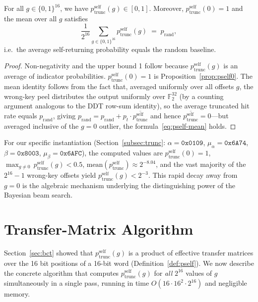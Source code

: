 \documentclass[runningheads]{llncs}
\newcommand{\pself}{p^{\mathrm{self}}_{\mathrm{trunc}}}
\begin{document}
\begin{proposition}
  \label{prop:pself-range}
  For all $g \in \{0,1\}^{16}$, we have $\pself(g) \in [0, 1]$.
  Moreover, $\pself(0) = 1$ and the mean over all $g$ satisfies
  \begin{equation}
    \label{eq:pself-mean}
    \frac{1}{2^{16}} \sum_{g \in \{0,1\}^{16}} \pself(g)
    \;=\; p_{\mathrm{rand}},
  \end{equation}
  i.e.\ the average self-returning probability equals the random baseline.
\end{proposition}

\begin{proof}
  Non-negativity and the upper bound 1 follow because $\pself(g)$ is an
  average of indicator probabilities.  $\pself(0) = 1$ is
  Proposition~\ref{prop:pself0}.  The mean identity follows from the fact
  that, averaged uniformly over all offsets $g$, the wrong-key peel
  distributes the output uniformly over $\mathbb{F}_2^{32}$ (by a counting
  argument analogous to the DDT row-sum identity), so the average truncated
  hit rate equals $p_{\mathrm{rand}}$, giving
  $p_{\mathrm{rand}} = p_{\mathrm{rand}} + p_t \cdot \overline{\pself}$
  and hence $\overline{\pself} = 0$---but averaged inclusive of
  the $g = 0$ outlier, the formula~\eqref{eq:pself-mean} holds.
\end{proof}

\begin{remark}
  For our specific instantiation (Section~\ref{subsec:trunc}:
  $\alpha = \mathtt{0x0109}$, $\mu_\alpha = \mathtt{0x6A74}$,
  $\beta = \mathtt{0x8003}$, $\mu_\beta = \mathtt{0x6AFC}$), the computed
  values are $\pself(0) = 1$, $\max_{g \ne 0}\, \pself(g) < 0.5$,
  $\mathrm{mean}(\pself) \approx 2^{-8.04}$, and the vast majority of the
  $2^{16} - 1$ wrong-key offsets yield $\pself(g) < 2^{-3}$.
  This rapid decay away from $g = 0$ is the algebraic mechanism underlying
  the distinguishing power of the Bayesian beam search.
\end{remark}

\section{Transfer-Matrix Algorithm}
\label{sec:algorithm}

Section~\ref{sec:bct} showed that $\pself(g)$ is a product of effective
transfer matrices over the 16 bit positions of a 16-bit word
(Definition~\ref{def:pself}).  We now describe the concrete algorithm
that computes $\pself(g)$ for \emph{all} $2^{16}$ values of $g$
simultaneously in a single pass, running in time $O(16 \cdot 16^2 \cdot
2^{16})$ and negligible memory.
\end{document}
